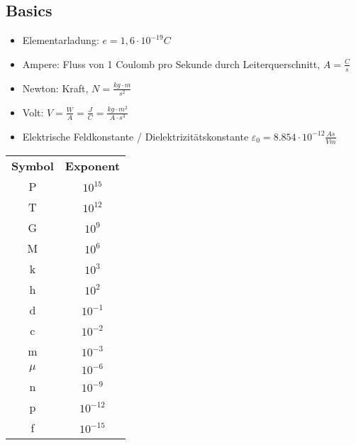 \subsection*{Basics}
    \begin{itemize}
        \item Elementarladung: $e = 1,6 \cdot 10^{-19} C$
        \item Ampere: Fluss von 1 Coulomb pro Sekunde durch Leiterquerschnitt, $A = \frac{C}{s}$
        \item Newton: Kraft, $N = \frac{kg \cdot m}{s^2}$
        \item Volt: $V = \frac{W}{A} = \frac{J}{C} = \frac{kg \cdot m^2}{A \cdot s^3}$
        \item         Elektrische Feldkonstante / Dielektrizitätskonstante $\varepsilon_0 = 8.854 \cdot 10^{-12} \frac{As}{Vm}$
    \end{itemize}
    
    \begin{tabular}{c c}
        \textbf{Symbol} & \textbf{Exponent}\\
        P & $10^{15}$ \\
        T & $10^{12}$ \\
        G & $10^9$ \\
        M & $10^6$ \\
        k & $10^3$ \\
        h & $10^2$ \\
        d & $10^{-1}$ \\
        c & $10^{-2}$ \\
        m & $10^{-3}$ \\
        $\mu$ & $10^{-6}$ \\
        n & $10^{-9}$ \\
        p & $10^{-12}$ \\
        f & $10^{-15}$ \\
    \end{tabular}